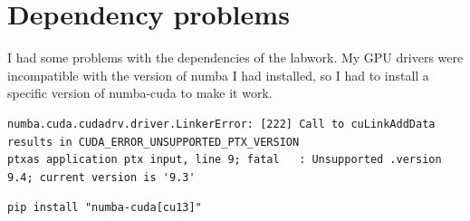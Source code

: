 \documentclass{article}
\begin{document}
\section{Dependency problems}

I had some problems with the dependencies of the labwork.
My GPU drivers were incompatible with the version of numba I had installed, so I had to install a specific version of numba-cuda to make it work.
\begin{lstlisting}
numba.cuda.cudadrv.driver.LinkerError: [222] Call to cuLinkAddData results in CUDA_ERROR_UNSUPPORTED_PTX_VERSION
ptxas application ptx input, line 9; fatal   : Unsupported .version 9.4; current version is '9.3'
\end{lstlisting}

\begin{lstlisting}
pip install "numba-cuda[cu13]"
\end{lstlisting}
\end{document}
